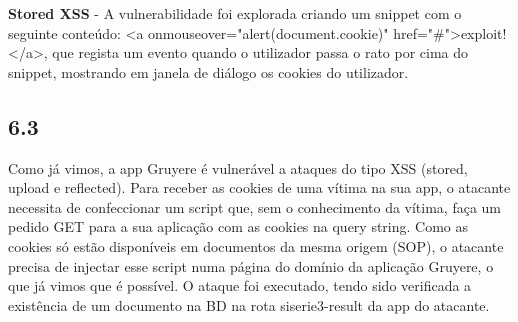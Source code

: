 \documentclass[11pt]{report}
\begin{document}
	 \textbf{Stored XSS} - A vulnerabilidade foi explorada criando um snippet com o seguinte conteúdo: <a onmouseover="alert(document.cookie)" href="\#">exploit!</a>, que regista um evento quando o utilizador passa o rato por cima do snippet, mostrando em janela de diálogo os cookies do utilizador.
	
	\subsection*{6.3}
	Como já vimos, a app Gruyere é vulnerável a ataques do tipo XSS (stored, upload e reflected). Para receber as cookies de uma vítima na sua app, o atacante necessita de confeccionar um script que, sem o conhecimento da vítima, faça um pedido GET para a sua aplicação com as cookies na query string.
	Como as cookies só estão disponíveis em documentos da mesma origem (SOP), o atacante precisa de injectar esse script numa página do domínio da aplicação Gruyere, o que já vimos que é possível.\newline
	O ataque foi executado, tendo sido verificada a existência de um documento na BD na rota siserie3-result da app do atacante.
\newpage
\end{document}

